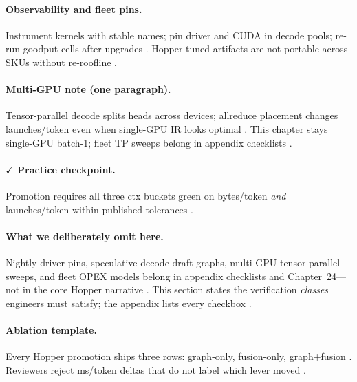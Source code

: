 \paragraph{Observability and fleet pins.}
Instrument kernels with stable names; pin driver and CUDA in decode pools; re-run goodput cells after upgrades \citep{yirage2026,taxbreak2026,memoryfloor2026,nvidia2024cudagraphs,patel2025llminference}.
Hopper-tuned artifacts are not portable across SKUs without re-roofline \citep{memoryfloor2026,taxbreak2026,liu2024deepseekv3}.

\paragraph{Multi-GPU note (one paragraph).}
Tensor-parallel decode splits heads across devices; allreduce placement changes launches/token even when single-GPU IR looks optimal \citep{liu2024deepseekv3,yirage2026,patel2025llminference}.
This chapter stays single-GPU batch-1; fleet TP sweeps belong in appendix checklists \citep{taxbreak2026,memoryfloor2026,kwon2023vllm}.

\paragraph{$\checkmark$ Practice checkpoint.}
Promotion requires all three ctx buckets green on bytes/token \emph{and} launches/token within published tolerances \citep{taxbreak2026,memoryfloor2026,yirage2026}.

\paragraph{What we deliberately omit here.}
Nightly driver pins, speculative-decode draft graphs, multi-GPU tensor-parallel sweeps, and fleet OPEX models belong in appendix checklists and Chapter~24---not in the core Hopper narrative \citep{patel2025llminference,kwon2023vllm,liu2024deepseekv3}.
This section states the verification \emph{classes} engineers must satisfy; the appendix lists every checkbox \citep{yirage2026}.

\paragraph{Ablation template.}
Every Hopper promotion ships three rows: graph-only, fusion-only, graph+fusion \citep{memoryfloor2026,nvidia2024cudagraphs,taxbreak2026}.
Reviewers reject ms/token deltas that do not label which lever moved \citep{patel2025llminference}.

